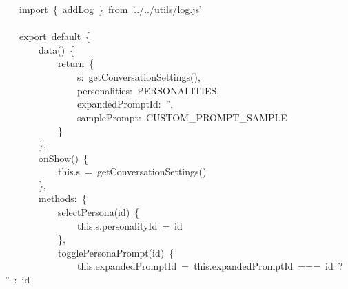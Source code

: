 \documentclass[a4paper,10pt]{article}
\begin{document}
{~~~~import~\{~addLog~\}~from~'../../utils/log.js'\\
\mbox{}\\
~~~~export~default~\{\\
~~~~~~~~data()~\{\\
~~~~~~~~~~~~return~\{\\
~~~~~~~~~~~~~~~~s:~getConversationSettings(),\\
~~~~~~~~~~~~~~~~personalities:~PERSONALITIES,\\
~~~~~~~~~~~~~~~~expandedPromptId:~'',\\
~~~~~~~~~~~~~~~~samplePrompt:~CUSTOM\_PROMPT\_SAMPLE\\
~~~~~~~~~~~~\}\\
~~~~~~~~\},\\
~~~~~~~~onShow()~\{\\
~~~~~~~~~~~~this.s~=~getConversationSettings()\\
~~~~~~~~\},\\
~~~~~~~~methods:~\{\\
~~~~~~~~~~~~selectPersona(id)~\{\\
~~~~~~~~~~~~~~~~this.s.personalityId~=~id\\
~~~~~~~~~~~~\},\\
~~~~~~~~~~~~togglePersonaPrompt(id)~\{\\
~~~~~~~~~~~~~~~~this.expandedPromptId~=~this.expandedPromptId~===~id~?~''~:~id
}

\newpage
\end{document}
